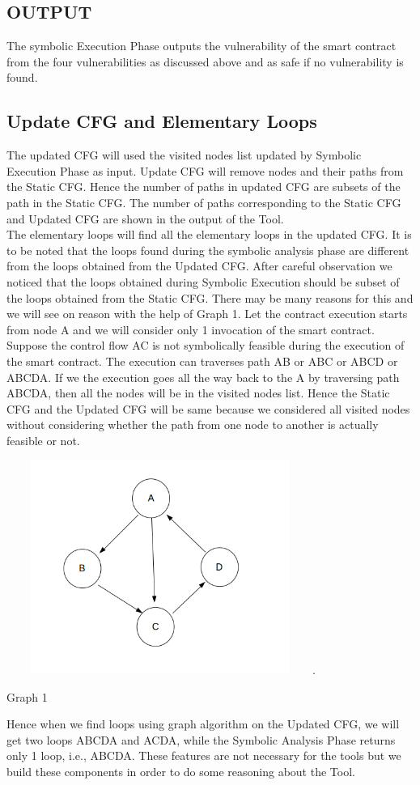 \subsection{OUTPUT}
The symbolic Execution Phase outputs the vulnerability of the smart contract from the four vulnerabilities as discussed above and as safe if no vulnerability is found.
\subsection{Update CFG and Elementary Loops}
The updated CFG will used the visited nodes list updated by Symbolic Execution Phase as input. Update CFG will remove nodes and their paths from the Static CFG. Hence the number of paths in updated CFG are subsets of the path in the Static CFG. The number of paths corresponding to the Static CFG and Updated CFG are shown in the output of the Tool.\\
The elementary loops will find all the elementary loops in the updated CFG. It is to be noted that the loops found during the symbolic analysis phase are different from the loops obtained from the Updated CFG. After careful observation we noticed that the loops obtained during Symbolic Execution should be subset of the loops obtained from the Static CFG. There may be many reasons for this and we will see on reason with the help of Graph 1. Let the contract execution starts from node A and we will consider only 1 invocation of the smart contract. Suppose the control flow AC is not symbolically feasible during the execution of the smart contract. The execution can traverses path AB or ABC or ABCD or ABCDA. If we the execution goes all the way back to the A by traversing path ABCDA, then all the nodes will be in the visited nodes list. Hence the Static CFG and the Updated CFG will be same because we considered all visited nodes without considering whether the path from one node to another is actually feasible or not.\\
\begin{center}
\includegraphics[width=10cm, height=7cm]{images/4.png}.

    Graph 1
\end{center}
Hence when we find loops using graph algorithm on the Updated CFG, we will get two loops ABCDA and ACDA, while the Symbolic Analysis Phase returns only 1 loop, i.e., ABCDA. These features are not necessary for the tools but we build these components in order to do some reasoning about the Tool.
